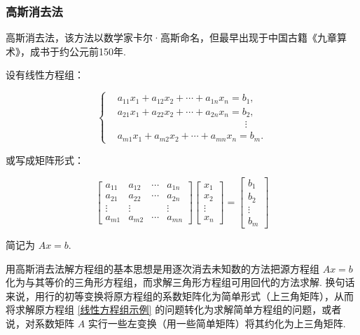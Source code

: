 \subsubsection{高斯消去法}

高斯消去法，该方法以数学家卡尔·高斯命名，但最早出现于中国古籍《九章算术》，成书于约公元前150年.

设有线性方程组：

\begin{equation}
    \left\{\begin{aligned}
         & a_{11}x_1 +  a_{12}x_2  +  \cdots  +  a_{1n}x_n = b_1, \\
         & a_{21}x_1 +  a_{22}x_2  +  \cdots  +  a_{2n}x_n = b_2, \\
         & \qquad\qquad\qquad\qquad\qquad\qquad\quad\vdots        \\
         & a_{m1}x_1 +  a_{m2}x_2  +  \cdots  +  a_{mn}x_n = b_m.
    \end{aligned}\right.
    \label{线性方程组示例}
\end{equation}

或写成矩阵形式：

\begin{equation*}
    \begin{bmatrix}
        a_{11} & a_{12} & \cdots & a_{1n} \\
        a_{21} & a_{22} & \cdots & a_{2n} \\
        \vdots & \vdots &        & \vdots \\
        a_{m1} & a_{m2} & \cdots & a_{mn}
    \end{bmatrix}
    \begin{bmatrix}
        x_1    \\
        x_2    \\
        \vdots \\
        x_n
    \end{bmatrix}
    =
    \begin{bmatrix}
        b_1    \\
        b_2    \\
        \vdots \\
        b_m
    \end{bmatrix}
\end{equation*}

简记为 $Ax = b$.

用高斯消去法解方程组的基本思想是用逐次消去未知数的方法把源方程组 $Ax = b$ 化为与其等价的三角形方程组，而求解三角形方程组可用回代的方法求解. 换句话来说，用行的初等变换将原方程组的系数矩阵化为简单形式（上三角矩阵），从而将求解原方程组 \eqref{线性方程组示例} 的问题转化为求解简单方程组的问题，或者说，对系数矩阵 $A$ 实行一些左变换（用一些简单矩阵）将其约化为上三角矩阵.

